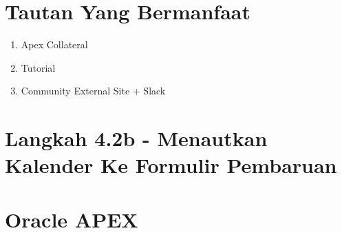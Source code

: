 \documentclass{article}
\begin{document}
\section{Tautan Yang Bermanfaat}
\begin{enumerate}
    \item Apex  Collateral 
\item Tutorial 
\item Community External Site + Slack 

\end{enumerate}
\section{Langkah 4.2b - Menautkan Kalender Ke Formulir Pembaruan}
\usepackage{Note: Anda Mungkin Harus Menavigasi Ke Bulan Mei Untuk Melihat Entri Kalender}
\section{Oracle APEX}
\usepackage{Oracle Apex Adalah Aplikais Yang Digunakan Oleh Pelanggan Nyata Untuk Aplikasi Nyata Yang Digunakan Untuk Aplikasi Kritis Oportuninistik Dan Misi Yang Melayani Puluhan Ribu Pengguna Produk Mapan Pertama Kali Dirilis Pada Tahun 2004 Platform Pengembangan Aplikasi Kode Rendah Yang Paling Kuat: Memungkinkan Pengembangan Untuk Ficus Dalam Memecahkan Masalah Bisnis Dan Memberikan Solusi Yang Unggul, Dengan Lebih Sedikit Waktu Dan Upaya Yang Dihabiskan Untuk Pengodean Tingkat Rendah Biasa Dan Berulang Terus Berkembang. Oracle Install Base Mengadopsi Oracle Apex Untuk Meningkatkan Jumlah Proyek Dan Semakin Menjadi Standar IT Korporat Yang Disetujui}
\end{document}
